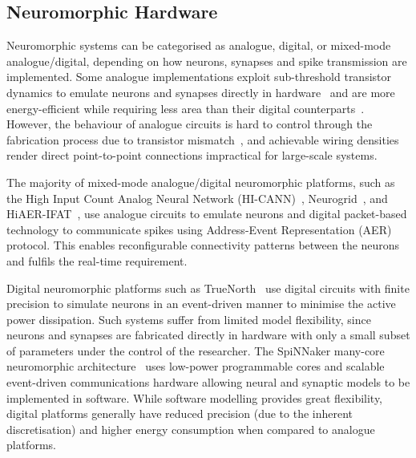 \subsection{Neuromorphic Hardware}
\label{subsec:neuromorphic_hw}
Neuromorphic systems can be categorised as analogue, digital, or mixed-mode analogue/digital, depending on how neurons, synapses and spike transmission are implemented. %
Some analogue implementations exploit sub-threshold transistor dynamics to emulate neurons and synapses directly in hardware~\citep{indiveri2011neuromorphic} and are more energy-efficient while requiring less area than their digital counterparts~\citep{joubert2012hardware}.
However, the behaviour of analogue circuits is hard to control through the fabrication process due to transistor mismatch~\citep{indiveri2011neuromorphic,pedram2006thermal,linares2003compact}, and achievable wiring densities render direct point-to-point connections impractical for large-scale systems.

The majority of mixed-mode analogue/digital neuromorphic platforms, such as the High Input Count Analog Neural Network (HI-CANN)~\citep{schemmel2010wafer}, Neurogrid~\citep{benjamin2014neurogrid}, and HiAER-IFAT~\citep{yu201265k}, use analogue circuits to emulate neurons and digital packet-based technology to communicate spikes using Address-Event Representation (AER)~\citep{lazzaro1995multi} protocol.
This enables reconfigurable connectivity patterns between the neurons and fulfils the real-time requirement.

Digital neuromorphic platforms such as TrueNorth~\citep{merolla2014million} use digital circuits with finite precision to simulate neurons in an event-driven manner to minimise the active power dissipation.
Such systems suffer from limited model flexibility, since neurons and synapses are fabricated directly in hardware with only a small subset of parameters under the control of the researcher.
The SpiNNaker many-core neuromorphic architecture~\citep{furber2014spinnaker} uses low-power programmable cores and scalable event-driven communications hardware allowing neural and synaptic models to be implemented in software.
While software modelling provides great flexibility, digital platforms generally have reduced precision (due to the inherent discretisation) and higher energy consumption when compared to analogue platforms.

